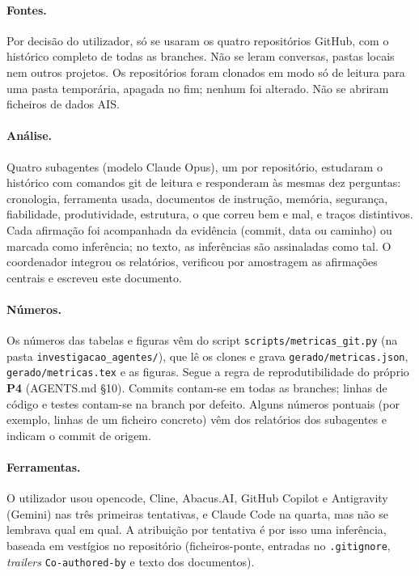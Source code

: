 \documentclass[11pt,a4paper]{article}
\newcommand{\Pquatro}{\textbf{P4}}
\begin{document}
\paragraph{Fontes.} Por decisão do utilizador, só se usaram os quatro repositórios GitHub, com o
histórico completo de todas as branches. Não se leram conversas, pastas locais nem outros
projetos. Os repositórios foram clonados em modo só de leitura para uma pasta temporária,
apagada no fim; nenhum foi alterado. Não se abriram ficheiros de dados AIS.

\paragraph{Análise.} Quatro subagentes (modelo Claude Opus), um por repositório, estudaram o
histórico com comandos git de leitura e responderam às mesmas dez perguntas: cronologia,
ferramenta usada, documentos de instrução, memória, segurança, fiabilidade, produtividade,
estrutura, o que correu bem e mal, e traços distintivos. Cada afirmação foi acompanhada da evidência (commit, data ou caminho) ou marcada como inferência;
no texto, as inferências são assinaladas como tal. O coordenador integrou os
relatórios, verificou por amostragem as afirmações centrais e escreveu este documento.

\paragraph{Números.} Os números das tabelas e figuras vêm do script
\texttt{scripts/metricas\_git.py} (na pasta \texttt{investigacao\_agentes/}), que lê os clones e grava
\texttt{gerado/metricas.json}, \texttt{gerado/metricas.tex} e as figuras. Segue a regra de
reprodutibilidade do próprio \Pquatro{} (AGENTS.md §10). Commits contam-se em todas as branches;
linhas de código e testes contam-se na branch por defeito. Alguns números pontuais (por exemplo,
linhas de um ficheiro concreto) vêm dos relatórios dos subagentes e indicam o commit de origem.

\paragraph{Ferramentas.} O utilizador usou opencode, Cline, Abacus.AI, GitHub Copilot e
Antigravity (Gemini) nas três primeiras tentativas, e Claude Code na quarta, mas não se lembrava
qual em qual. A atribuição por tentativa é por isso uma inferência, baseada em vestígios no
repositório (ficheiros-ponte, entradas no \texttt{.gitignore}, \emph{trailers}
\texttt{Co-authored-by} e texto dos documentos).
\end{document}

